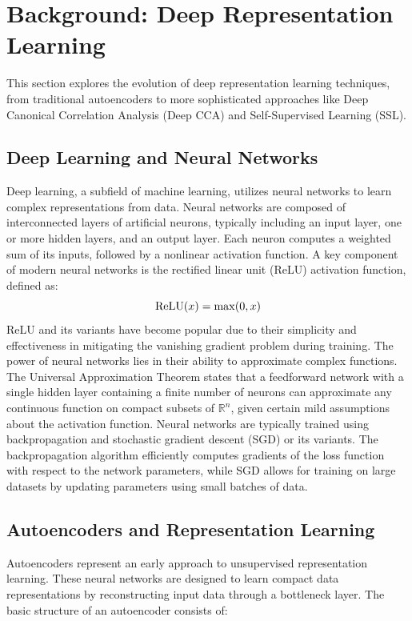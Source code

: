 \section{Background: Deep Representation Learning}

This section explores the evolution of deep representation learning techniques, from traditional autoencoders to more sophisticated approaches like Deep Canonical Correlation Analysis (Deep CCA) and Self-Supervised Learning (SSL).

\subsection{Deep Learning and Neural Networks}
Deep learning, a subfield of machine learning, utilizes neural networks to learn complex representations from data. Neural networks are composed of interconnected layers of artificial neurons, typically including an input layer, one or more hidden layers, and an output layer. Each neuron computes a weighted sum of its inputs, followed by a nonlinear activation function.
A key component of modern neural networks is the rectified linear unit (ReLU) activation function, defined as:
\begin{equation}
\operatorname{ReLU}(x) = \max(0, x)
\end{equation}
ReLU and its variants have become popular due to their simplicity and effectiveness in mitigating the vanishing gradient problem during training.
The power of neural networks lies in their ability to approximate complex functions. The Universal Approximation Theorem \citep{cybenko1989approximation,hornik1991approximation} states that a feedforward network with a single hidden layer containing a finite number of neurons can approximate any continuous function on compact subsets of $\mathbb{R}^n$, given certain mild assumptions about the activation function.
Neural networks are typically trained using backpropagation and stochastic gradient descent (SGD) or its variants. The backpropagation algorithm efficiently computes gradients of the loss function with respect to the network parameters, while SGD allows for training on large datasets by updating parameters using small batches of data.
\subsection{Autoencoders and Representation Learning}
Autoencoders represent an early approach to unsupervised representation learning. These neural networks are designed to learn compact data representations by reconstructing input data through a bottleneck layer. The basic structure of an autoencoder consists of:

